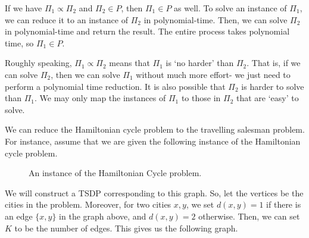\documentclass[a4paper, openany]{memoir}
\begin{document}
If we have $\Pi_1 \varpropto \Pi_2$ and $\Pi_2 \in P$, then $\Pi_1 \in P$ as well. To solve an instance of $\Pi_1$, we can reduce it to an instance of $\Pi_2$ in polynomial-time. Then, we can solve $\Pi_2$ in polynomial-time and return the result. The entire process takes polynomial time, so $\Pi_1 \in P$. 

Roughly speaking, $\Pi_1 \varpropto \Pi_2$ means that $\Pi_1$ is `no harder' than $\Pi_2$. That is, if we can solve $\Pi_2$, then we can solve $\Pi_1$ without much more effort- we just need to perform a polynomial time reduction. It is also possible that $\Pi_2$ is harder to solve than $\Pi_1$. We may only map the instances of $\Pi_1$ to those in $\Pi_2$ that are `easy' to solve.

We can reduce the Hamiltonian cycle problem to the travelling salesman problem. For instance, assume that we are given the following instance of the Hamiltonian cycle problem.
\begin{figure}[H]
    \centering
    \caption{An instance of the Hamiltonian Cycle problem.}
\end{figure}
\noindent We will construct a TSDP corresponding to this graph. So, let the vertices be the cities in the problem. Moreover, for two cities $x, y$, we set $d(x, y) = 1$ if there is an edge $\{x, y\}$ in the graph above, and $d(x, y) = 2$ otherwise. Then, we can set $K$ to be the number of edges. This gives us the following graph.
\end{document}
